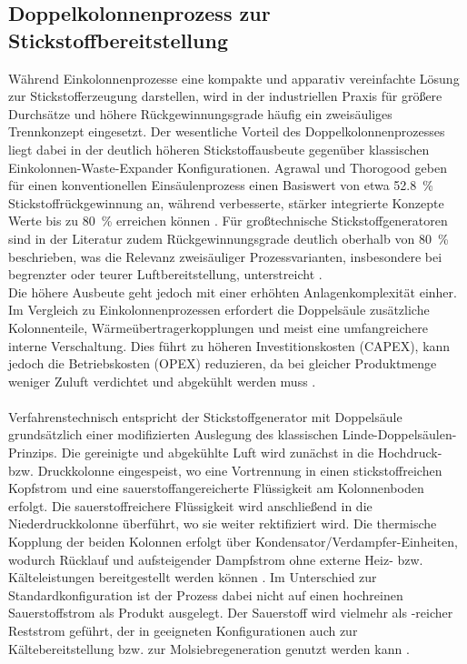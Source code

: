 \subsection{Doppelkolonnenprozess zur Stickstoffbereitstellung}
\label{sec:grundlagen_doppelsäule_N2}

Während Einkolonnenprozesse eine kompakte und apparativ vereinfachte Lösung zur Stickstofferzeugung darstellen, wird in der industriellen Praxis für größere Durchsätze und höhere Rückgewinnungsgrade häufig ein zweisäuliges Trennkonzept eingesetzt. Der wesentliche Vorteil des Doppelkolonnenprozesses liegt dabei in der deutlich höheren Stickstoffausbeute gegenüber klassischen Einkolonnen-Waste-Expander Konfigurationen. Agrawal und Thorogood geben für einen konventionellen Einsäulenprozess einen Basiswert von etwa \SI{52,8}{\percent} Stickstoffrückgewinnung an, während verbesserte, stärker integrierte Konzepte Werte bis zu \SI{80}{\percent} erreichen können \cite{agrawalProductionMediumPressure1991}. Für großtechnische Stickstoffgeneratoren sind in der Literatur zudem Rückgewinnungsgrade deutlich oberhalb von \SI{80}{\percent} beschrieben, was die Relevanz zweisäuliger Prozessvarianten, insbesondere bei begrenzter oder teurer Luftbereitstellung, unterstreicht \cite{heinz-wolfgangharingAirGasesNitrogen2007}.\\
Die höhere Ausbeute geht jedoch mit einer erhöhten Anlagenkomplexität einher. Im Vergleich zu Einkolonnenprozessen erfordert die Doppelsäule zusätzliche Kolonnenteile, Wärmeübertragerkopplungen und meist eine umfangreichere interne Verschaltung. Dies führt zu höheren Investitionskosten (CAPEX), kann jedoch die Betriebskosten (OPEX) reduzieren, da bei gleicher Produktmenge weniger Zuluft verdichtet und abgekühlt werden muss \cite{agrawalEfficientCryogenicNitrogen1991}. \\
\\
Verfahrenstechnisch entspricht der Stickstoffgenerator mit Doppelsäule grundsätzlich einer modifizierten Auslegung des klassischen Linde-Doppelsäulen-Prinzips. Die gereinigte und abgekühlte Luft wird zunächst in die Hochdruck- bzw. Druckkolonne eingespeist, wo eine Vortrennung in einen stickstoffreichen Kopfstrom und eine sauerstoffangereicherte Flüssigkeit am Kolonnenboden erfolgt. Die sauerstoffreichere Flüssigkeit wird anschließend in die Niederdruckkolonne überführt, wo sie weiter rektifiziert wird. Die thermische Kopplung der beiden Kolonnen erfolgt über Kondensator/Verdampfer-Einheiten, wodurch Rücklauf und aufsteigender Dampfstrom ohne externe Heiz- bzw. Kälteleistungen bereitgestellt werden können \cite{heinz-wolfgangharingAirGasesNitrogen2007, agrawalEfficientCryogenicNitrogen1991}. Im Unterschied zur Standardkonfiguration ist der Prozess dabei nicht auf einen hochreinen Sauerstoffstrom als Produkt ausgelegt. Der Sauerstoff wird vielmehr als -reicher Reststrom geführt, der in geeigneten Konfigurationen auch zur Kältebereitstellung bzw. zur Molsiebregeneration genutzt werden kann \cite{nickbockerUllmannsEncyclopediaIndustrial2000}.\\
